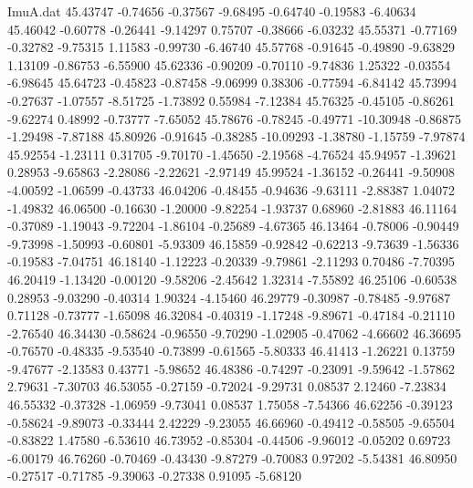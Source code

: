 \begin{filecontents}{ImuA.dat}
  45.43747   -0.74656   -0.37567   -9.68495   -0.64740   -0.19583   -6.40634
  45.46042   -0.60778   -0.26441   -9.14297    0.75707   -0.38666   -6.03232
  45.55371   -0.77169   -0.32782   -9.75315    1.11583   -0.99730   -6.46740
  45.57768   -0.91645   -0.49890   -9.63829    1.13109   -0.86753   -6.55900
  45.62336   -0.90209   -0.70110   -9.74836    1.25322   -0.03554   -6.98645
  45.64723   -0.45823   -0.87458   -9.06999    0.38306   -0.77594   -6.84142
  45.73994   -0.27637   -1.07557   -8.51725   -1.73892    0.55984   -7.12384
  45.76325   -0.45105   -0.86261   -9.62274    0.48992   -0.73777   -7.65052
  45.78676   -0.78245   -0.49771  -10.30948   -0.86875   -1.29498   -7.87188
  45.80926   -0.91645   -0.38285  -10.09293   -1.38780   -1.15759   -7.97874
  45.92554   -1.23111    0.31705   -9.70170   -1.45650   -2.19568   -4.76524
  45.94957   -1.39621    0.28953   -9.65863   -2.28086   -2.22621   -2.97149
  45.99524   -1.36152   -0.26441   -9.50908   -4.00592   -1.06599   -0.43733
  46.04206   -0.48455   -0.94636   -9.63111   -2.88387    1.04072   -1.49832
  46.06500   -0.16630   -1.20000   -9.82254   -1.93737    0.68960   -2.81883
  46.11164   -0.37089   -1.19043   -9.72204   -1.86104   -0.25689   -4.67365
  46.13464   -0.78006   -0.90449   -9.73998   -1.50993   -0.60801   -5.93309
  46.15859   -0.92842   -0.62213   -9.73639   -1.56336   -0.19583   -7.04751
  46.18140   -1.12223   -0.20339   -9.79861   -2.11293    0.70486   -7.70395
  46.20419   -1.13420   -0.00120   -9.58206   -2.45642    1.32314   -7.55892
  46.25106   -0.60538    0.28953   -9.03290   -0.40314    1.90324   -4.15460
  46.29779   -0.30987   -0.78485   -9.97687    0.71128   -0.73777   -1.65098
  46.32084   -0.40319   -1.17248   -9.89671   -0.47184   -0.21110   -2.76540
  46.34430   -0.58624   -0.96550   -9.70290   -1.02905   -0.47062   -4.66602
  46.36695   -0.76570   -0.48335   -9.53540   -0.73899   -0.61565   -5.80333
  46.41413   -1.26221    0.13759   -9.47677   -2.13583    0.43771   -5.98652
  46.48386   -0.74297   -0.23091   -9.59642   -1.57862    2.79631   -7.30703
  46.53055   -0.27159   -0.72024   -9.29731    0.08537    2.12460   -7.23834
  46.55332   -0.37328   -1.06959   -9.73041    0.08537    1.75058   -7.54366
  46.62256   -0.39123   -0.58624   -9.89073   -0.33444    2.42229   -9.23055
  46.66960   -0.49412   -0.58505   -9.65504   -0.83822    1.47580   -6.53610
  46.73952   -0.85304   -0.44506   -9.96012   -0.05202    0.69723   -6.00179
  46.76260   -0.70469   -0.43430   -9.87279   -0.70083    0.97202   -5.54381
  46.80950   -0.27517   -0.71785   -9.39063   -0.27338    0.91095   -5.68120

\end{filecontents}
